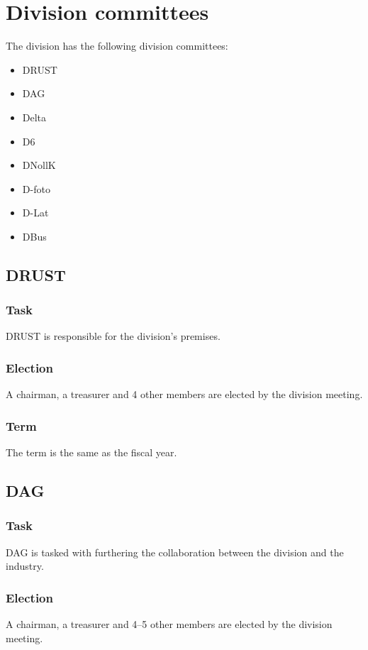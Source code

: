 \section{Division committees}

The division has the following division committees:

\begin{itemize}
  \item DRUST 
  \item DAG 
  \item Delta 
  \item D6 
  \item DNollK
  \item D-foto
  \item D-Lat
  \item DBus
\end{itemize}

\subsection{DRUST} 

\subsubsection{Task}
DRUST is responsible for the division's premises. 

\subsubsection{Election}
A chairman, a treasurer and 4 other members are elected by the division meeting. 

\subsubsection{Term}
The term is the same as the fiscal year. 

\subsection{DAG}

\subsubsection{Task}
DAG is tasked with furthering the collaboration between the division and the industry. 

\subsubsection{Election}
A chairman, a treasurer and 4--5 other members are elected by the division meeting. 

